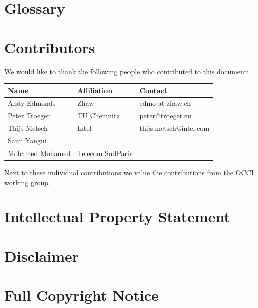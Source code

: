 \documentclass[10pt,a4paper]{article}
\begin{document}
\section{Glossary}
\label{sec:glossary}


\section{Contributors}
We would like to thank the following people who contributed to this
document:

\begin{tabular}{l|p{2in}|p{2in}}
Name & Affiliation & Contact \\
\hline
Andy Edmonds & Zhaw & edmo at zhaw.ch \\
Peter Troeger & TU Chemnitz & peter@troeger.eu \\
Thijs Metsch & Intel & thijs.metsch@intel.com\\
Sami Yangui & & \\
Mohamed Mohamed & Telecom SudParis & \\
\end{tabular}

Next to these individual contributions we value the contributions from
the OCCI working group.

\section{Intellectual Property Statement}


\section{Disclaimer}


\section{Full Copyright Notice}




\end{document}
